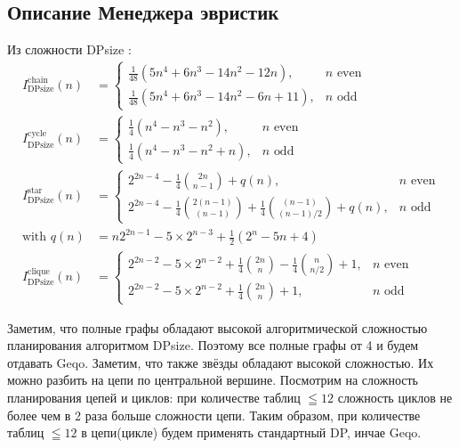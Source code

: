 \documentclass[12pt]{article}
\begin{document}
\begin{flushleft}
\section*{Описание Менеджера эвристик}
Из сложности DPsize \cite{Moerkotte}:
\begin{align*}
    I^{\text{chain}}_{\text{DPsize}}(n) &=
    \begin{cases}
        \frac{1}{48} (5n^4 + 6n^3 - 14n^2 - 12n), & n \text{ even} \\
        \frac{1}{48} (5n^4 + 6n^3 - 14n^2 - 6n + 11), & n \text{ odd}
    \end{cases}
    \\
    I^{\text{cycle}}_{\text{DPsize}}(n) &=
    \begin{cases}
        \frac{1}{4} (n^4 - n^3 - n^2), & n \text{ even} \\
        \frac{1}{4} (n^4 - n^3 - n^2 + n), & n \text{ odd}
    \end{cases}
    \\
    I^{\text{star}}_{\text{DPsize}}(n) &=
    \begin{cases}
        2^{2n-4} - \frac{1}{4} \binom{2n}{n-1} + q(n), & n \text{ even} \\
        2^{2n-4} - \frac{1}{4} \binom{2(n-1)}{(n-1)} + \frac{1}{4} \binom{(n-1)}{(n-1)/2} + q(n), & n \text{ odd}
    \end{cases}
    \\
    \text{with } q(n) &= n 2^{2n-1} - 5 \times 2^{n-3} + \frac{1}{2} (2^n - 5n + 4)
    \\
    I^{\text{clique}}_{\text{DPsize}}(n) &=
    \begin{cases}
        2^{2n-2} - 5 \times 2^{n-2} + \frac{1}{4} \binom{2n}{n} - \frac{1}{4} \binom{n}{n/2} + 1, & n \text{ even} \\
        2^{2n-2} - 5 \times 2^{n-2} + \frac{1}{4} \binom{2n}{n} + 1, & n \text{ odd}
    \end{cases}
\end{align*}

Заметим, что полные графы  обладают высокой алгоритмической сложностью планирования
алгоритмом DPsize. Поэтому все полные графы от 4 и будем отдавать Geqo. Заметим, что также 
звёзды обладают высокой сложностью. Их можно разбить на цепи по центральной вершине.
Посмотрим на сложность планирования цепей и циклов: при количестве таблиц $\leqq 12$ сложность циклов не более чем в 2 раза 
больше сложности цепи. Таким образом, при количестве таблиц $\leqq 12$ в цепи(цикле) будем применять стандартный DP, инчае Geqo.


\end{flushleft}
\end{document}
